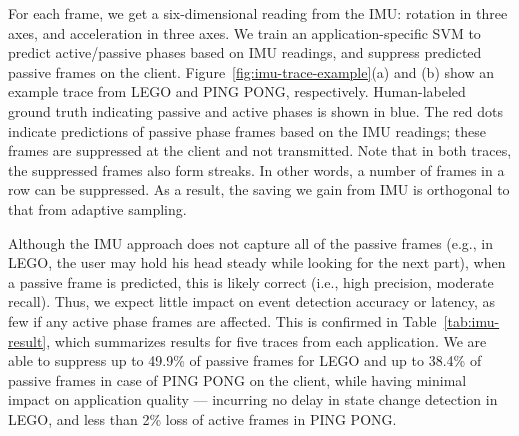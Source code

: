 For each frame, we get a six-dimensional reading from the IMU:
rotation in three axes, and acceleration in three axes.  We train an
application-specific SVM to predict active/passive phases based on IMU
readings, and suppress predicted passive frames on the client.
Figure~\ref{fig:imu-trace-example}(a) and (b) show an example trace
from LEGO and PING PONG, respectively.  Human-labeled ground truth
indicating passive and active phases is shown in blue.  The red dots
indicate predictions of passive phase frames based on the IMU
readings; these frames are suppressed at the client and not
transmitted.  Note that in both traces, the suppressed frames also
form streaks. In other words, a number of frames in a row can be
suppressed. As a result, the saving we gain from IMU is orthogonal to
that from adaptive sampling.

Although the IMU approach does not capture all of the passive frames
(e.g., in LEGO, the user may hold his head steady while looking for
the next part), when a passive frame is predicted, this is likely
correct (i.e., high precision, moderate recall).  Thus, we expect
little impact on event detection accuracy or latency, as few if any
active phase frames are affected.  This is confirmed in
Table~\ref{tab:imu-result}, which summarizes results for five traces
from each application.  We are able to suppress up to 49.9\% of
passive frames for LEGO and up to 38.4\% of passive frames in case of
PING PONG on the client, while having minimal impact on application
quality --- incurring no delay in state change detection in LEGO, and
less than 2\% loss of active frames in PING PONG.


